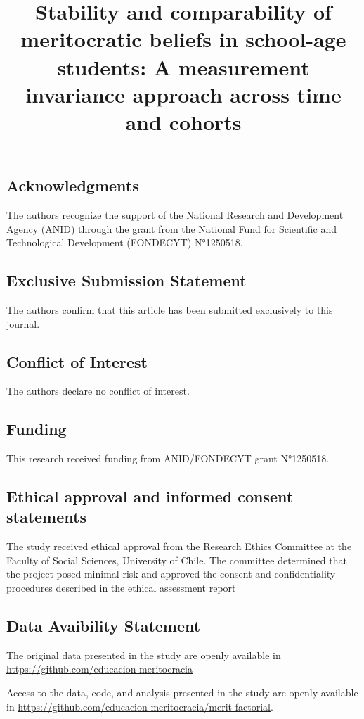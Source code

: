 \documentclass[
  12pt,
  letterpaper,
  DIV=11,
  numbers=noendperiod]{scrartcl}
\title{Stability and comparability of meritocratic beliefs in school-age
students: A measurement invariance approach across time and cohorts}
\author{}
\date{}
\begin{document}
\maketitle


\subsection{Acknowledgments}\label{acknowledgments}

The authors recognize the support of the National Research and
Development Agency (ANID) through the grant from the National Fund for
Scientific and Technological Development (FONDECYT) N°1250518.

\subsection{Exclusive Submission
Statement}\label{exclusive-submission-statement}

The authors confirm that this article has been submitted exclusively to
this journal.

\subsection{Conflict of Interest}\label{conflict-of-interest}

The authors declare no conflict of interest.

\subsection{Funding}\label{funding}

This research received funding from ANID/FONDECYT grant N°1250518.

\subsection{Ethical approval and informed consent
statements}\label{ethical-approval-and-informed-consent-statements}

The study received ethical approval from the Research Ethics Committee
at the Faculty of Social Sciences, University of Chile. The committee
determined that the project posed minimal risk and approved the consent
and confidentiality procedures described in the ethical assessment
report

\subsection{Data Avaibility Statement}\label{data-avaibility-statement}

The original data presented in the study are openly available in
\url{https://github.com/educacion-meritocracia}

Access to the data, code, and analysis presented in the study are openly
available in
\url{https://github.com/educacion-meritocracia/merit-factorial}.
\end{document}

